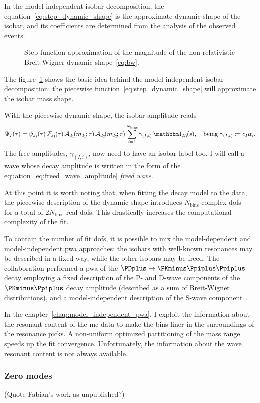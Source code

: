     In the model-independent isobar decomposition, the equation~\eqref{eq:step_dynamic_shape} is the approximate dynamic shape of the isobar, and its coefficients are determined from the analysis of the observed events.
    \begin{figure}
        \centering
        
        \caption{Step-function approximation of the magnitude of the non-relativistic Breit-Wigner dynamic shape~\eqref{eq:bw}.}
        \label{fig:step_function_approximation}
    \end{figure}
    The figure~\ref{fig:step_function_approximation} shows the basic idea behind the model-independent isobar decomposition: the piecewise function~\eqref{eq:step_dynamic_shape} will approximate the isobar mass shape.


    With the piecewise dynamic shape, the isobar amplitude reads
    \begin{equation}\label{eq:freed_wave_amplitude}
        \Psi_I(\tau) = \psi_{J_I\!}(\tau)\,\mathcal{F\!}_{J_I\!}(\tau)\,\A_{d_1}\!(m_{d_1\!}; \tau)\,\A_{d_2}\!(m_{d_2\!}; \tau) \sum_{i=1}^{N_\text{bins}} \gamma_{(I,i)}\, \Characteristic_{B_i}\!(s),
        \quad
        \text{being }
        \gamma_{(I,i)} \coloneqq c_I \alpha_i. 
    \end{equation}
    The free amplitudes, $\gamma_{(I,i)}$, now need to have an isobar label too.
    I will call a wave whose decay amplitude is written in the form of the equation~\eqref{eq:freed_wave_amplitude} \emph{freed wave}.


    At this point it is worth noting that, when fitting the decay model to the data, the piecewise description of the dynamic shape introduces $N_\text{bins}$ complex \acp{dof}---for a total of $2N_{\text{bins}}$ real \acp{dof}.
    This drastically increases the computational complexity of the fit.


    To contain the number of fit \acp{dof}, it is possible to mix the model-dependent and model-independent \ac{pwa} approaches: the isobars with well-known resonances may be described in a fixed way, while the other isobars may be freed.
    The \focus{} collaboration performed a \ac{pwa} of the $\PDplus \to \PKminus\Ppiplus\Ppiplus$ decay employing a fixed description of the P- and D-wave components of the $\PKminus\Ppiplus$ decay amplitude (described as a sum of Breit-Wigner distributions), and a model-independent description of the S-wave component~\cite{Link200914}.


    In the chapter~\ref{chap:model_independent_pwa}, I exploit the information about the resonant content of the \ac{mc} data to make the bins finer in the surroundings of the resonance picks.
    A non-uniform optimized partitioning of the mass range speeds up the fit convergence.
    Unfortunately, the information about the wave resonant content is not always available.


        \subsubsection{Zero modes}
        

    {\color{red}
    (Quote Fabian's work as unpublished?)
    }

